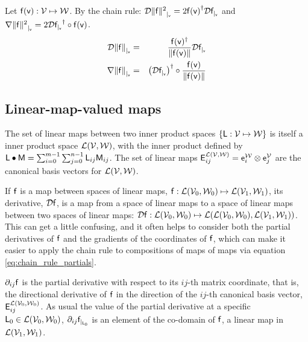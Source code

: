 Let $\mathsf{f}(\mathsf{v}) : \mathcal{V} \mapsto \mathcal{W}$.
By the chain rule:
${\mathcal{D}{\| \mathsf{f} \|^2}_{\mid_{\mathsf{v}}}}  =  2 {\mathsf{f}(\mathsf{v})}^{\dagger} {\mathcal{D}{\mathsf{f}}_{\mid_{\mathsf{v}}}} $
and
${\mathbf \nabla}{\| \mathsf{f} \|^2}_{\mid_{\mathsf{v}}}  =  2 {\mathcal{D}{\mathsf{f}}_{\mid_{\mathsf{v}}}}^\dagger \circ \mathsf{f}(\mathsf{v})$.
\begin{eqnarray}
\label{eq:norm_derivative}
{\mathcal{D}{\| \mathsf{f}\|}_{\mid_{\mathsf{v}}}}
& = &
\frac{\mathsf{f}(\mathsf{v})^\dagger}{\| \mathsf{f}(\mathsf{v}) \|} {\mathcal{D}{\mathsf{f}}_{\mid_{\mathsf{v}}}}  \\
{\mathbf \nabla}{\| \mathsf{f} \|}_{\mid_{\mathsf{v}}}
& = &
\left({\mathcal{D}{\mathsf{f}}_{\mid_{\mathsf{v}}}}\right)^\dagger \circ  \frac{\mathsf{f}(\mathsf{v})}{ \| \mathsf{f}(\mathsf{v})  \|}
\label{eq:norm_gradient}
\end{eqnarray}


\subsection{Linear-map-valued maps}
\label{sec:Linear-map-valued-maps}

The set of linear maps between two inner product spaces
$\{ \mathsf{L} : \mathcal{V} \mapsto \mathcal{W} \}$
is itself a inner product space $\mathcal{L}(\mathcal{V},\mathcal{W})$,
with the inner product defined by
$\mathsf{L} \bullet \mathsf{M} = \sum_{i=0}^{m-1} \sum_{j=0}^{n-1} \mathsf{L}_{ij} \mathsf{M}_{ij}$.
The set of linear maps
$\mathsf{E}_{ij}^{\mathcal{L}(\mathcal{V},\mathcal{W})}  = \mathsf{e}_i^{\mathcal{W}} \otimes \mathsf{e}_j^{\mathcal{V}}$
are the canonical basis vectors for $\mathcal{L}(\mathcal{V},\mathcal{W})$.

If $\mathsf{f}$ is a map between spaces of linear maps,
$\mathsf{f} : \mathcal{L}(\mathcal{V}_0,\mathcal{W}_0) \mapsto \mathcal{L}(\mathcal{V}_1,\mathcal{W}_1)$,
its derivative, ${\mathcal{D}{\mathsf{f}}}$,
is a map from a space of linear maps
to a space of linear maps between two
spaces of linear maps:
${\mathcal{D}{\mathsf{f}}} : \mathcal{L}(\mathcal{V}_0,\mathcal{W}_0) \mapsto
\mathcal{L}(\mathcal{L}(\mathcal{V}_0,\mathcal{W}_0), \mathcal{L}(\mathcal{V}_1,\mathcal{W}_1))$.
This can get a little confusing,
and it often helps to consider both the partial derivatives of $\mathsf{f}$
and the gradients of the coordinates of $\mathsf{f}$,
which can make it easier to apply the chain rule to
compositions of maps of maps via equation \ref{eq:chain_rule_partials}.

${\partial}_{ij}{\mathsf{f}}$ is the partial derivative with respect to its $ij$-th matrix coordinate,
that is, the directional derivative of $\mathsf{f}$ in the direction
of the $ij$-th canonical basis vector, $\mathsf{E}_{ij}^{\mathcal{L}(\mathcal{V}_0,\mathcal{W}_0)}$.
As usual the value of the partial derivative at a specific
$\mathsf{L}_0 \in  \mathcal{L}(\mathcal{V}_0,\mathcal{W}_0)$,
${\partial}_{ij}{\mathsf{f}}_{\mid_{\mathsf{L}_0}}$ is an element of the co-domain of $\mathsf{f}$,
a linear map in  $\mathcal{L}(\mathcal{V}_1,\mathcal{W}_1)$.

